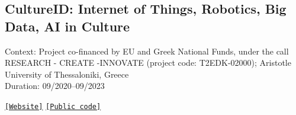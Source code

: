 \subsection{CultureID: Internet of Things, Robotics, Big Data, AI in Culture}

Context: Project co-financed by EU and Greek National Funds, under the call RESEARCH - CREATE -INNOVATE (project code: T2EDK-02000); Aristotle University of Thessaloniki, Greece\\

\noindent Duration: 09/2020--09/2023

\noindent \href{https://cultureid.web.auth.gr/?page_id=216&lang=en}{\texttt{[Website]}} \href{https://github.com/cultureid-auth-ros-packages}{\texttt{[Public code]}}\\

